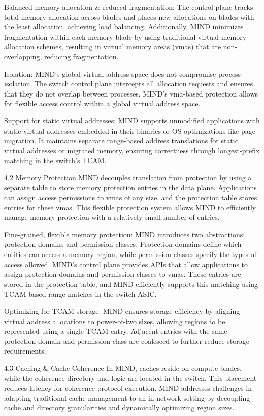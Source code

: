 Balanced memory allocation \& reduced fragmentation: The control plane tracks total memory allocation across blades and places new allocations on blades with the least allocation, achieving load balancing. Additionally, MIND minimizes fragmentation within each memory blade by using traditional virtual memory allocation schemes, resulting in virtual memory areas (vmas) that are non-overlapping, reducing fragmentation.

Isolation: MIND's global virtual address space does not compromise process isolation. The switch control plane intercepts all allocation requests and ensures that they do not overlap between processes. MIND's vma-based protection allows for flexible access control within a global virtual address space.

Support for static virtual addresses: MIND supports unmodified applications with static virtual addresses embedded in their binaries or OS optimizations like page migration. It maintains separate range-based address translations for static virtual addresses or migrated memory, ensuring correctness through longest-prefix matching in the switch’s TCAM.

4.2 Memory Protection
MIND decouples translation from protection by using a separate table to store memory protection entries in the data plane. Applications can assign access permissions to vmas of any size, and the protection table stores entries for these vmas. This flexible protection system allows MIND to efficiently manage memory protection with a relatively small number of entries.

Fine-grained, flexible memory protection: MIND introduces two abstractions: protection domains and permission classes. Protection domains define which entities can access a memory region, while permission classes specify the types of access allowed. MIND’s control plane provides APIs that allow applications to assign protection domains and permission classes to vmas. These entries are stored in the protection table, and MIND efficiently supports this matching using TCAM-based range matches in the switch ASIC.

Optimizing for TCAM storage: MIND ensures storage efficiency by aligning virtual address allocations to power-of-two sizes, allowing regions to be represented using a single TCAM entry. Adjacent entries with the same protection domain and permission class are coalesced to further reduce storage requirements.

4.3 Caching \& Cache Coherence
In MIND, caches reside on compute blades, while the coherence directory and logic are located in the switch. This placement reduces latency for coherence protocol execution. MIND addresses challenges in adapting traditional cache management to an in-network setting by decoupling cache and directory granularities and dynamically optimizing region sizes.

